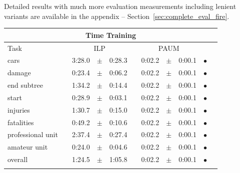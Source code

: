 Detailed results with much more evaluation measurements including lenient variants are available in the appendix -- Section~\ref{sec:complete_eval_fire}.



\begin{table}
\centering 
\begin{tabular}
{lcrclcrcl@{\hspace{0.1cm}}cc}

\multicolumn{11}{c}{Time Training}\\
\hline
Task && \multicolumn{3}{c}{ILP}  && \multicolumn{3}{c}{PAUM} && \\
\hline
              cars &&     3:28.0 &  $\pm$  &      0:28.3 & &     0:02.2 &  $\pm$  &      0:00.1 & $\bullet$ \\
            damage &&     0:23.4 &  $\pm$  &      0:06.2 & &     0:02.2 &  $\pm$  &      0:00.1 & $\bullet$ \\
       end subtree &&     1:34.2 &  $\pm$  &      0:14.4 & &     0:02.2 &  $\pm$  &      0:00.1 & $\bullet$ \\
             start &&     0:28.9 &  $\pm$  &      0:03.1 & &     0:02.2 &  $\pm$  &      0:00.1 & $\bullet$ \\
          injuries &&     1:30.7 &  $\pm$  &      0:15.0 & &     0:02.2 &  $\pm$  &      0:00.1 & $\bullet$ \\
        fatalities &&     0:49.2 &  $\pm$  &      0:10.6 & &     0:02.2 &  $\pm$  &      0:00.1 & $\bullet$ \\
  professional unit &&     2:37.4 &  $\pm$  &      0:27.4 & &     0:02.2 &  $\pm$  &      0:00.1 & $\bullet$ \\
      amateur unit &&     0:24.0 &  $\pm$  &      0:04.6 & &     0:02.2 &  $\pm$  &      0:00.1 & $\bullet$ \\
\hline
           overall &&     1:24.5 &  $\pm$  &      1:05.8 & &     0:02.2 &  $\pm$  &      0:00.1 & $\bullet$ \\
\hline
\\


\end{tabular}
\end{table}
